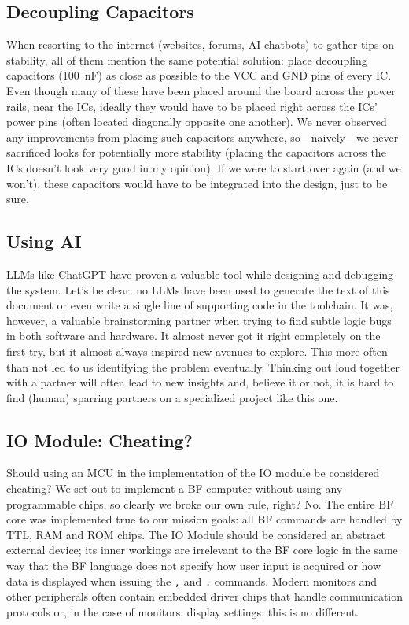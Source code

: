 \subsection{Decoupling Capacitors} When resorting to the internet (websites, forums, AI chatbots) to gather tips on stability, all of them mention the same potential solution: place decoupling capacitors (100~nF) as close as possible to the VCC and GND pins of every IC. Even though many of these have been placed around the board across the power rails, near the ICs, ideally they would have to be placed right across the ICs' power pins (often located diagonally opposite one another). We never observed any improvements from placing such capacitors anywhere, so---naively---we never sacrificed looks for potentially more stability (placing the capacitors across the ICs doesn't look very good in my opinion). If we were to start over again (and we won't), these capacitors would have to be integrated into the design, just to be sure.

\subsection{Using AI} LLMs like ChatGPT have proven a valuable tool while designing and debugging the system. Let's be clear: no LLMs have been used to generate the text of this document or even write a single line of supporting code in the toolchain. It was, however, a valuable brainstorming partner when trying to find subtle logic bugs in both software and hardware. It almost never got it right completely on the first try, but it almost always inspired new avenues to explore. This more often than not led to us identifying the problem eventually. Thinking out loud together with a partner will often lead to new insights and, believe it or not, it is hard to find (human) sparring partners on a specialized project like this one.

\subsection{IO Module: Cheating?} Should using an MCU in the implementation of the IO module be considered cheating? We set out to implement a BF computer without using any programmable chips, so clearly we broke our own rule, right? No. The entire BF core was implemented true to our mission goals: all BF commands are handled by TTL, RAM and ROM chips. The IO Module should be considered an abstract external device; its inner workings are irrelevant to the BF core logic in the same way that the BF language does not specify how user input is acquired or how data is displayed when issuing the \texttt{,} and \texttt{.} commands. Modern monitors and other peripherals often contain embedded driver chips that handle communication protocols or, in the case of monitors, display settings; this is no different.

